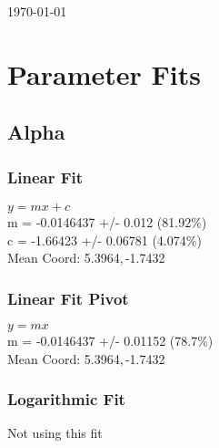 \documentclass{article}
\begin{document}
\small{\today}
\section{Parameter Fits}
	\subsection{Alpha}
		\subsubsection{Linear Fit}
			\begin{minipage}[h]{0.6\textwidth}
					\begin{center}
						\begingroup{}
			  			\resizebox{\textwidth}{!}{%
							
			  			}\endgroup
					\end{center}
			\end{minipage}
			\begin{minipage}[h]{0.35\textwidth}
				$y = mx + c$ \\
				m               = -0.0146437       +/- 0.012        (81.92\%) \\
				c               = -1.66423         +/- 0.06781      (4.074\%) \\

				Mean Coord: 5.3964,\,-1.7432
			\end{minipage}

		\subsubsection{Linear Fit Pivot}
			\begin{minipage}[h]{0.6\textwidth}
					\begin{center}
						\begingroup{}
			  			\resizebox{\textwidth}{!}{%
							
			  			}\endgroup
					\end{center}
			\end{minipage}
			\begin{minipage}[h]{0.35\textwidth}
				$y = mx$ \\
				m               = -0.0146437       +/- 0.01152      (78.7\%) \\

				Mean Coord: 5.3964,\,-1.7432
			\end{minipage}

		\subsubsection{Logarithmic Fit}
			\begin{minipage}[h]{0.6\textwidth}
					\begin{center}
						\begingroup{}
			  			\resizebox{\textwidth}{!}{%
							
			  			}\endgroup
					\end{center}
			\end{minipage}
			\begin{minipage}[h]{0.35\textwidth}
				Not using this fit
			\end{minipage}
\end{document}
